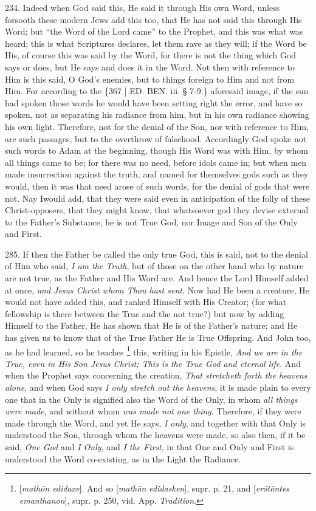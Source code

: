234. Indeed
when God said this, He said it through His own Word, unless forsooth
these modern Jews add this too, that He has not said this through His
Word; but ``the Word of the Lord came'' to the Prophet, and this was
what was heard; this is what Scriptures declares, let them rave as
they will; if the Word be His, of course this was said by the Word,
for there is not the thing which God says or does, but He says and
does it in the Word. Not then with reference to Him is this said, O
God's enemies, but to things foreign to Him and not from Him. For
according to the \{367 | ED. BEN.
iii. § 7-9.\} aforesaid image, if the sun had spoken those words he
would have been setting right the error, and have so spoken, not as
separating his radiance from him, but in his own radiance showing his
own light. Therefore, not for the denial of the Son, nor with
reference to Him, are such passages, but to the overthrow of
falsehood. Accordingly God spoke not such words to Adam at the
beginning, though His Word was with Him, by whom all things came to
be; for there was no need, before idols came in; but when men made
insurrection against the truth, and named for themselves gods such as
they would, then it was that need arose of such words, for the denial
of gods that were not. Nay I\emph{}would add, that they were said
even in anticipation of the folly of these Christ-opposers, that they
might know, that whatsoever god they devise external to the Father's
Substance, he is not True God, nor Image and Son of the Only and
First.

285. If then
the Father be called the only true God, this is said, not to the
denial of Him who said, \emph{I am the Truth}, but of those on the
other hand who by nature are not true, as the Father and His Word are.
And hence the Lord Himself added at once, \emph{and Jesus Christ whom
Thou hast sent}. Now had He been a creature, He would not have
added this, and ranked Himself with His Creator; (for what fellowship
is there between the True and the not true?) but now by adding Himself
to the Father, He has shown that He is of the Father's nature; and He
has given us to know that of the True Father He is True Offspring. And
John too, as he had learned, so he teaches \footnote{[\emph{math\={o}n edidaxe}]. And so [\emph{math\={o}n edidasken}],
supr. p. 21, and [\emph{er\={o}t\={o}ntes emanthanon}], supr. p.
250, vid. App. \emph{Tradition}.} this, writing in his Epistle, \emph{And we are in the True, even
in His Son Jesus Christ; This is the True God and eternal life}.
And when the Prophet says concerning the creation, \emph{That stretcheth
forth the heavens alone}, and when God says \emph{I only stretch
out the heavens}, it is made plain to every one that in the Only is
signified also the Word of the Only, in whom \emph{all things were made},
and without whom \emph{was made not one thing}. Therefore, if they
were made through the Word, and yet He says, \emph{I only}, and
together with that Only is understood the Son, through whom the
heavens were made, so also then, if it be said, \emph{One God} and \emph{I
Only}, and \emph{I the First}, in that One and Only and First is
understood the Word co-existing, as in the Light the Radiance.


